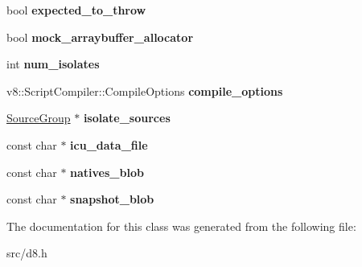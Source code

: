 \begin{DoxyCompactItemize}
\item 
\hypertarget{classv8_1_1_shell_options_ae85fcfe7caddc5dca5d2b15bef3d120a}{}bool {\bfseries expected\+\_\+to\+\_\+throw}\label{classv8_1_1_shell_options_ae85fcfe7caddc5dca5d2b15bef3d120a}

\item 
\hypertarget{classv8_1_1_shell_options_a1a3438baa8bc8603c04ee0e4340a5c98}{}bool {\bfseries mock\+\_\+arraybuffer\+\_\+allocator}\label{classv8_1_1_shell_options_a1a3438baa8bc8603c04ee0e4340a5c98}

\item 
\hypertarget{classv8_1_1_shell_options_ae54d644c9cf130de4621fc7da0238811}{}int {\bfseries num\+\_\+isolates}\label{classv8_1_1_shell_options_ae54d644c9cf130de4621fc7da0238811}

\item 
\hypertarget{classv8_1_1_shell_options_a709958f798705295ed94fc1558c05833}{}v8\+::\+Script\+Compiler\+::\+Compile\+Options {\bfseries compile\+\_\+options}\label{classv8_1_1_shell_options_a709958f798705295ed94fc1558c05833}

\item 
\hypertarget{classv8_1_1_shell_options_a07329ee8598bf8dc66974fdd8a01f2f5}{}\hyperlink{classv8_1_1_source_group}{Source\+Group} $\ast$ {\bfseries isolate\+\_\+sources}\label{classv8_1_1_shell_options_a07329ee8598bf8dc66974fdd8a01f2f5}

\item 
\hypertarget{classv8_1_1_shell_options_a18d1f36a0620224c26d36622b1d5a5c0}{}const char $\ast$ {\bfseries icu\+\_\+data\+\_\+file}\label{classv8_1_1_shell_options_a18d1f36a0620224c26d36622b1d5a5c0}

\item 
\hypertarget{classv8_1_1_shell_options_a00989ecefd272d78eacc1e335582a4a5}{}const char $\ast$ {\bfseries natives\+\_\+blob}\label{classv8_1_1_shell_options_a00989ecefd272d78eacc1e335582a4a5}

\item 
\hypertarget{classv8_1_1_shell_options_a44f7c4c6255df6c8ff8303cf5154c622}{}const char $\ast$ {\bfseries snapshot\+\_\+blob}\label{classv8_1_1_shell_options_a44f7c4c6255df6c8ff8303cf5154c622}

\end{DoxyCompactItemize}


The documentation for this class was generated from the following file\+:\begin{DoxyCompactItemize}
\item 
src/d8.\+h\end{DoxyCompactItemize}
